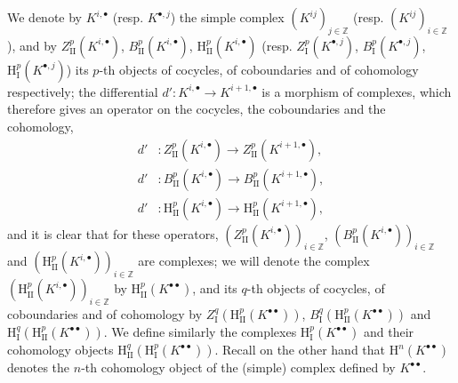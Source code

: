 \begin{env}[11.3.1]
We denote by $K^{i,\bullet}$ (resp. $K^{\bullet,j}$) the simple complex
$(K^{ij})_{j\in\mathbb Z}$ (resp. $(K^{ij})_{i\in\mathbb Z}$), and by
$Z_{\mathrm{II}}^p(K^{i,\bullet})$, $B_{\mathrm{II}}^p(K^{i,\bullet})$,
$\mathrm H_{\mathrm{II}}^p(K^{i,\bullet})$ (resp.
$Z_{\mathrm I}^p(K^{\bullet,j})$, $B_{\mathrm I}^p(K^{\bullet,j})$,
$\mathrm H_{\mathrm I}^p(K^{\bullet,j})$) its $p$-th objects of cocycles,
of coboundaries and of cohomology respectively; the differential
$d':K^{i,\bullet}\to K^{i+1,\bullet}$ is a morphism of complexes, which
therefore gives an operator on the cocycles, the coboundaries and the cohomology,
\[
\begin{aligned}
  d'&:Z_{\mathrm{II}}^p(K^{i,\bullet})
      \longrightarrow Z_{\mathrm{II}}^p(K^{i+1,\bullet}),\\
  d'&:B_{\mathrm{II}}^p(K^{i,\bullet})
      \longrightarrow B_{\mathrm{II}}^p(K^{i+1,\bullet}),\\
  d'&:\mathrm H_{\mathrm{II}}^p(K^{i,\bullet})
      \longrightarrow \mathrm H_{\mathrm{II}}^p(K^{i+1,\bullet}),
\end{aligned}
\]
and it is clear that for these operators,
$(Z_{\mathrm{II}}^p(K^{i,\bullet}))_{i\in\mathbb Z}$,
$(B_{\mathrm{II}}^p(K^{i,\bullet}))_{i\in\mathbb Z}$ and
$(\mathrm H_{\mathrm{II}}^p(K^{i,\bullet}))_{i\in\mathbb Z}$ are
complexes; we will denote the complex
$(\mathrm H_{\mathrm{II}}^p(K^{i,\bullet}))_{i\in\mathbb Z}$ by
$\mathrm H_{\mathrm{II}}^p(K^{\bullet\bullet})$, and its $q$-th objects of
cocycles, of coboundaries and of cohomology by
$Z_{\mathrm I}^q(\mathrm H_{\mathrm{II}}^p(K^{\bullet\bullet}))$,
$B_{\mathrm I}^q(\mathrm H_{\mathrm{II}}^p(K^{\bullet\bullet}))$ and
$\mathrm H_{\mathrm I}^q(\mathrm H_{\mathrm{II}}^p(K^{\bullet\bullet}))$.
We define similarly the complexes
$\mathrm H_{\mathrm I}^p(K^{\bullet\bullet})$ and their cohomology objects
$\mathrm H_{\mathrm{II}}^q(\mathrm H_{\mathrm I}^p(K^{\bullet\bullet}))$.
Recall on the other hand that $\mathrm H^n(K^{\bullet\bullet})$ denotes the
$n$-th cohomology object of the (simple) complex defined by
$K^{\bullet\bullet}$.
\end{env}

